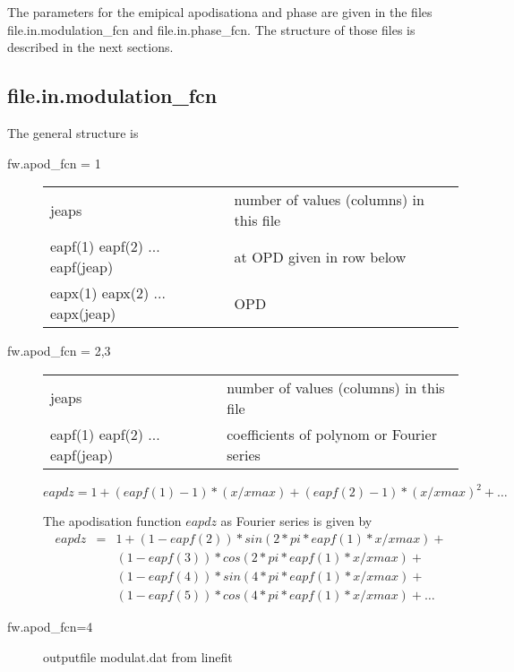 \documentclass[a4paper]{article}
\begin{document}
The parameters for the emipical apodisationa and phase are given in
the files file.in.modulation\_fcn and file.in.phase\_fcn. The
structure of those files is described in the next sections. 




\subsection{file.in.modulation\_fcn}

The
general structure is 
\begin{description}
\item[fw.apod\_fcn = 1]\hspace{2cm}
  
  \noindent
  \begin{tabular}{ll}  
    jeaps & number of values (columns) in this file\\
    eapf(1) eapf(2) ... eapf(jeap)& at OPD given in row below\\
    eapx(1) eapx(2) ... eapx(jeap) & OPD\\
  \end{tabular}
\item[fw.apod\_fcn = 2,3]\hspace{2cm}
  
  \noindent
  \begin{tabular}{ll}  
    jeaps & number of values (columns) in this file\\
    eapf(1) eapf(2) ... eapf(jeap)& coefficients of polynom or Fourier series\\
  \end{tabular}
\begin{equation}
  eapdz = 1 + (eapf(1)-1)*(x/xmax) + (eapf(2)-1)*(x/xmax)^2 + \ldots
\end{equation}

  The apodisation function $eapdz$ as Fourier series is given by
  \begin{eqnarray}
    eapdz &=& 1 + (1-eapf(2))*sin(2*pi*eapf(1)*x/xmax) +\\
          &&(1-eapf(3))*cos(2*pi*eapf(1)*x/xmax) +\\
          &&(1-eapf(4))*sin(4*pi*eapf(1)*x/xmax) +\\
          &&(1-eapf(5))*cos(4*pi*eapf(1)*x/xmax) +\ldots    
  \end{eqnarray}
\item[fw.apod\_fcn=4] outputfile modulat.dat from linefit
\end{description}
\end{document}
